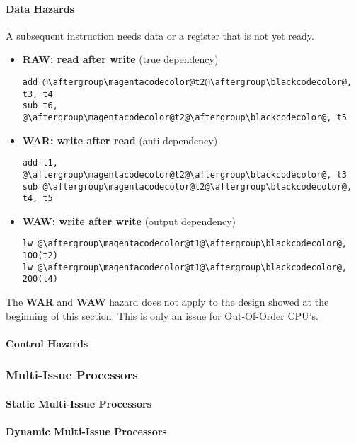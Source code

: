\begin{multicols*}{3}
    \paragraph{Data Hazards}\label{data hazards}

    A subsequent instruction needs data or a register that is not yet ready.

    \begin{itemize}
        \item \textbf{RAW: read after write} (true dependency)
              \begin{lstlisting}[escapechar=@]
add @\aftergroup\magentacodecolor@t2@\aftergroup\blackcodecolor@, t3, t4
sub t6, @\aftergroup\magentacodecolor@t2@\aftergroup\blackcodecolor@, t5
\end{lstlisting}
        \item \textbf{WAR: write after read} (anti dependency)
              \begin{lstlisting}[escapechar=@]
add t1, @\aftergroup\magentacodecolor@t2@\aftergroup\blackcodecolor@, t3
sub @\aftergroup\magentacodecolor@t2@\aftergroup\blackcodecolor@, t4, t5
\end{lstlisting}
        \item \textbf{WAW: write after write} (output dependency)
              \begin{lstlisting}[escapechar=@]
lw @\aftergroup\magentacodecolor@t1@\aftergroup\blackcodecolor@, 100(t2)
lw @\aftergroup\magentacodecolor@t1@\aftergroup\blackcodecolor@, 200(t4)
\end{lstlisting}
    \end{itemize}

    The \textbf{WAR} and \textbf{WAW} hazard does not apply to the design showed at the beginning of this section. This is only an issue for Out-Of-Order CPU's.

    \newpar{}

    \paragraph{Control Hazards}\label{control hazards}

    \subsubsection{Multi-Issue Processors}\label{multi-issue processors}

    \paragraph{Static Multi-Issue Processors}

    \paragraph{Dynamic Multi-Issue Processors}

\end{multicols*}